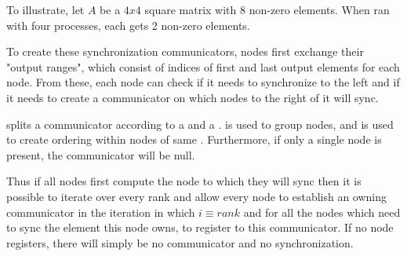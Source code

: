 \documentclass[thesis=M,english]{FITthesis}[2019/12/23]
\begin{document}
To illustrate, let $A$ be a $4x4$ square matrix with 8 non-zero elements. When ran with
four processes, each gets 2 non-zero elements.



To create these synchronization communicators, nodes first exchange their "output ranges",
which consist of indices of first and last output elements for each node. From
these, each node can check if it needs to synchronize to the left and if it needs to
create a communicator on which nodes to the right of it will sync.

 splits a communicator according to a  and a .
 is used to group nodes, and  is used to create ordering within nodes
of same . Furthermore, if only a single node is present, the communicator will
be null.

Thus if all nodes first compute the node to which they will sync then it is possible
to iterate over every rank and allow every node to establish an owning communicator
in the iteration in which $i \equiv rank$ and for all the nodes which need to sync
the element this node owns, to register to this communicator. If no node registers,
there will simply be no communicator and no synchronization.
\end{document}
